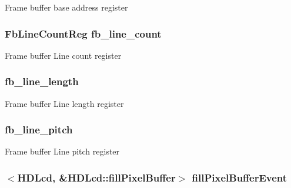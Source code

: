 \label{classHDLcd_ad9fd5ba71c5b40acdb6fd9adc4fa408b}
Frame buffer base address register \hypertarget{classHDLcd_a91b3e136cdfa6ff77cbb933239223919}{
\subsubsection[{fb\_\-line\_\-count}]{\setlength{\rightskip}{0pt plus 5cm}FbLineCountReg {\bf fb\_\-line\_\-count}}}
\label{classHDLcd_a91b3e136cdfa6ff77cbb933239223919}
Frame buffer Line count register \hypertarget{classHDLcd_adeb07f49b4b2b8898397dbec03f22bb3}{
\subsubsection[{fb\_\-line\_\-count}]{}}
\label{classHDLcd_adeb07f49b4b2b8898397dbec03f22bb3}
\hypertarget{classHDLcd_ab09d20d3fb341f97725e4f27efbee0bd}{
\subsubsection[{fb\_\-line\_\-length}]{ {\bf fb\_\-line\_\-length}}}
\label{classHDLcd_ab09d20d3fb341f97725e4f27efbee0bd}
Frame buffer Line length register \hypertarget{classHDLcd_a4f20b06285d7a67e4182c190c282ab9b}{
\subsubsection[{fb\_\-line\_\-pitch}]{ {\bf fb\_\-line\_\-pitch}}}
\label{classHDLcd_a4f20b06285d7a67e4182c190c282ab9b}
Frame buffer Line pitch register \hypertarget{classHDLcd_a1735216e127216309b2b871f35b62fc7}{
\subsubsection[{fillPixelBufferEvent}]{$<${\bf HDLcd}, \&HDLcd::fillPixelBuffer$>$ {\bf fillPixelBufferEvent}}}
